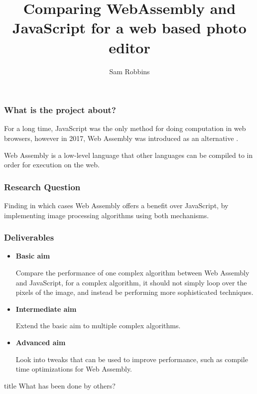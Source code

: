 \documentclass{beamer}
\title{Comparing WebAssembly and JavaScript for a web based photo editor}
\author{Sam Robbins}
\institute{Durham University}
\date{}
\begin{document}
\frame{\titlepage}

\begin{frame}
    \frametitle{What is the project about?}

    For a long time, JavaScript was the only method for doing computation in web browsers, however in 2017, Web Assembly was introduced as an alternative \cite{haas2017bringing}.

    \begin{definition}
        Web Assembly is a low-level language that other languages can be compiled to in order for execution on the web.
    \end{definition}




\end{frame}

\begin{frame}
    \frametitle{Research Question}
    Finding in which cases Web Assembly offers a benefit over JavaScript, by implementing image processing algorithms using both mechanisms.
\end{frame}

\begin{frame}
    \frametitle{Deliverables}
    \begin{itemize}
        \item \textbf{Basic aim}

              Compare the performance of one complex algorithm between Web Assembly and JavaScript, for a complex algorithm, it should not simply loop over the pixels of the image, and instead be performing more sophisticated techniques.
        \item \textbf{Intermediate aim}

              Extend the basic aim to multiple complex algorithms.
        \item \textbf{Advanced aim}

              Look into tweaks that can be used to improve performance, such as compile time optimizations for Web Assembly.
    \end{itemize}
\end{frame}

\begin{frame}
    \vfill
    \centering
    \begin{beamercolorbox}[sep=8pt,center,shadow=true,rounded=true]{title}
         What has been done by others?\par%
    \end{beamercolorbox}
    \vfill
\end{frame}
\end{document}
